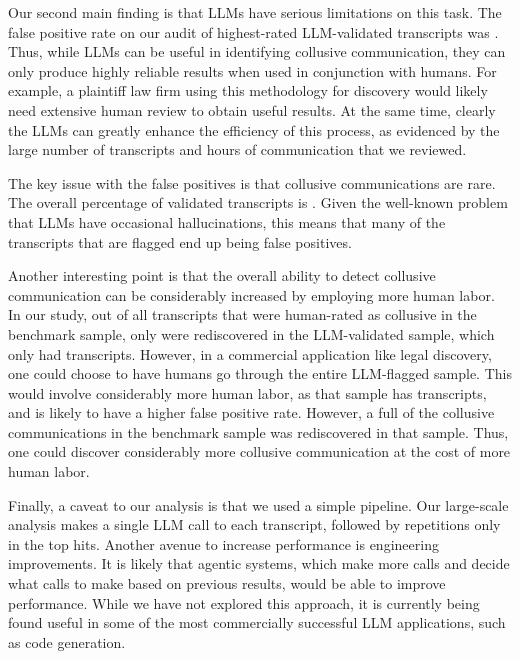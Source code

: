 Our second main finding is that LLMs have serious limitations on this task. The false positive rate on our audit of highest-rated LLM-validated transcripts was . Thus, while LLMs can be useful in identifying collusive communication, they can only produce highly reliable results when used in conjunction with humans. For example, a plaintiff law firm using this methodology for discovery would likely need extensive human review to obtain useful results. At the same time, clearly the LLMs can greatly enhance the efficiency of this process, as evidenced by the large number of transcripts and hours of communication that we reviewed.

The key issue with the false positives is that collusive communications are rare. The overall percentage of validated transcripts is . Given the well-known problem that LLMs have occasional hallucinations, this means that many of the transcripts that are flagged end up being false positives.

Another interesting point is that the overall ability to detect collusive communication can be considerably increased by employing more human labor. In our study, out of all transcripts that were human-rated as collusive in the benchmark sample, only  were rediscovered in the LLM-validated sample, which only had  transcripts. However, in a commercial application like legal discovery, one could choose to have humans go through the entire LLM-flagged sample. This would involve considerably more human labor, as that sample has  transcripts, and is likely to have a higher false positive rate. However, a full  of the collusive communications in the benchmark sample was rediscovered in that sample. Thus, one could discover considerably more collusive communication at the cost of more human labor.

Finally, a caveat to our analysis is that we used a simple pipeline. Our large-scale analysis makes a single LLM call to each transcript, followed by repetitions only in the top hits. Another avenue to increase performance is engineering improvements. It is likely that agentic systems, which make more calls and decide what calls to make based on previous results, would be able to improve performance. While we have not explored this approach, it is currently being found useful in some of the most commercially successful LLM applications, such as code generation.
